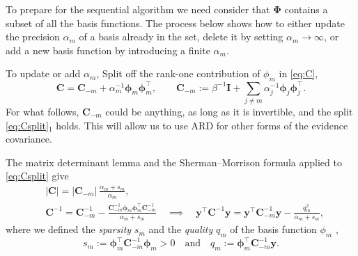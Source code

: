 \documentclass[a4paper]{article}
\renewcommand{\vec}[1]{\boldsymbol{#1}}
\begin{document}
To prepare for the sequential algorithm we need consider that $\mathbf \Phi$ contains a subset of all the basis functions. The process below shows how to either update the precision $\alpha_m$ of a basis already in the set, delete it by setting $\alpha_m \to \infty$, or add a new basis function by introducing a finite $\alpha_m$.

To update or add $\alpha_m$, Split off the rank-one contribution of $\phi_m$ in \eqref{eq:C},
\begin{equation} \label{eq:Csplit}
    \mathbf C = \mathbf C_{-m} + \alpha_m^{-1} \vec \phi_m \vec \phi_m^\top,
    \qquad
    \mathbf C_{-m} := \beta^{-1} \mathbf{I} + \sum_{j \neq m} \alpha_j^{-1} \vec \phi_j \vec \phi_j^\top.
\end{equation}
For what follows, $\mathbf C_{-m}$ could be anything, as long as it is invertible, and the split \eqref{eq:Csplit}${}_1$ holds. This will allow us to use ARD for other forms of the evidence covariance.

The matrix determinant lemma and the Sherman--Morrison formula applied to \eqref{eq:Csplit} give
\begin{align} \label{eq:det rank 1}
    & |\mathbf C| = |\mathbf C_{-m}| \, \frac{\alpha_m + s_m}{\alpha_m},
    \\
    \label{eq:inverse rank 1}
    & \mathbf C^{-1} = \mathbf C_{-m}^{-1} - \frac{\mathbf C_{-m}^{-1} \vec \phi_m \vec \phi_m^\top \mathbf C_{-m}^{-1}}{\alpha_m + s_m}
    \quad \implies \quad
    \mathbf y^\top \mathbf C^{-1} \mathbf y = \mathbf y^\top \mathbf C_{-m}^{-1} \mathbf y - \frac{q_m^2}{\alpha_m + s_m},
\end{align}
where we defined the \emph{sparsity} $s_m$ and the \emph{quality} $q_m$ of the basis function $\phi_m$ \autocite{tipping2003fast},
\begin{equation} \label{eq:sq}
    s_m := \vec \phi_m^\top \mathbf C_{-m}^{-1} \vec \phi_m > 0 \quad \text{and} \quad 
    q_m := \vec \phi_m^\top \mathbf C_{-m}^{-1} \mathbf y.
\end{equation}
\end{document}
